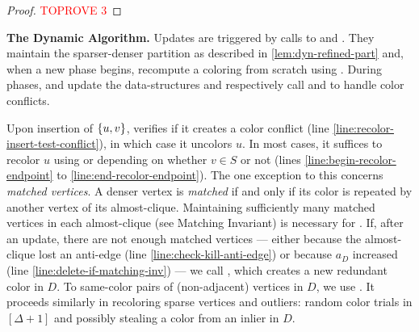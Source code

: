 \documentclass[a4paper,english,11pt]{amsart}
\renewcommand{\paragraph}[1]{\medskip\noindent\textbf{#1}}
\theoremstyle{definition}
\DeclarePairedDelimiter{\set}{\{}{\}}
\begin{document}
\begin{proof}\textcolor{red}{TOPROVE 3}\end{proof}


\paragraph{The Dynamic Algorithm.}
Updates are triggered by calls to \Insert and \Delete. They maintain the sparser-denser partition as described in \cref{lem:dyn-refined-part} and, when a new phase begins, recompute a coloring from scratch using \FreshColoring. During phases, \Insert and \Delete update the data-structures and respectively call \RecolorInsert and \RecolorDelete to handle color conflicts.

Upon insertion of $\set{u,v}$, \RecolorInsert verifies if it creates a color conflict (line \ref{line:recolor-insert-test-conflict}), in which case it uncolors $u$. In most cases, it suffices to recolor $u$ using \RecolorSparse or \RecolorDense depending on whether $v\in S$ or not (lines \ref{line:begin-recolor-endpoint} to \ref{line:end-recolor-endpoint}). The one exception to this concerns \emph{matched vertices}. A denser vertex is \emph{matched} if and only if its color is repeated by another vertex of its almost-clique. Maintaining sufficiently many matched vertices in each almost-clique (see Matching Invariant) is necessary for \RecolorDense. If, after an update, there are not enough matched vertices --- either because the almost-clique lost an anti-edge (line \ref{line:check-kill-anti-edge}) or because $a_D$ increased (line \ref{line:delete-if-matching-inv}) --- we call , which creates a new redundant color in $D$. To same-color pairs of (non-adjacent) vertices in $D$, we use \RecolorMatching. It proceeds similarly in recoloring sparse vertices and outliers: random color trials in $[\Delta+1]$ and possibly stealing a color from an inlier in $D$.
\end{document}
